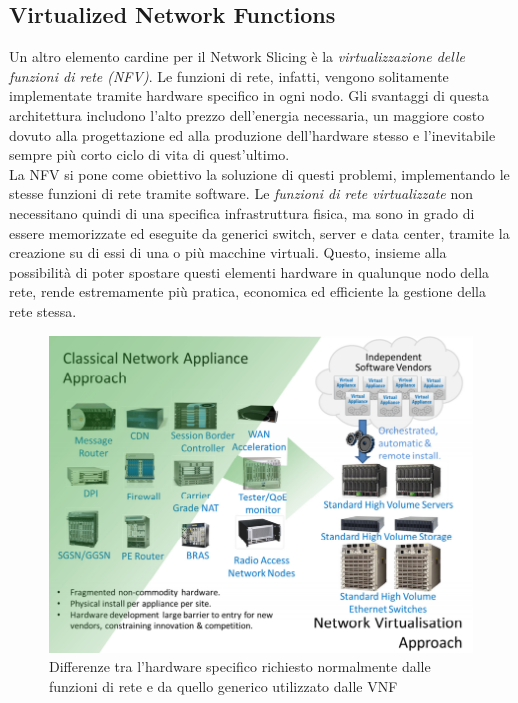 \subsection{Virtualized Network Functions}\label{ch:1.1.2}
Un altro elemento cardine per il Network Slicing è la \textit{virtualizzazione delle funzioni di rete (NFV)}. Le funzioni di rete, infatti, vengono solitamente implementate tramite hardware specifico in ogni nodo. Gli svantaggi di questa architettura includono l'alto prezzo dell'energia necessaria, un maggiore costo dovuto alla progettazione ed alla produzione dell'hardware stesso e l'inevitabile sempre più corto ciclo di vita di quest'ultimo.\\
La NFV si pone come obiettivo la soluzione di questi problemi, implementando le stesse funzioni di rete tramite software. Le \textit{funzioni di rete virtualizzate} non necessitano quindi di una specifica infrastruttura fisica, ma sono in grado di essere memorizzate ed eseguite da generici switch, server e data center, tramite la creazione su di essi di una o più macchine virtuali. Questo, insieme alla possibilità di poter spostare questi elementi hardware in qualunque nodo della rete, rende estremamente più pratica, economica ed efficiente la gestione della rete stessa. \cite{telecom_nfv}
\begin{figure}[h!]
	\centering
	\includegraphics[width=0.8\linewidth]{../immagini/nfv}
	\caption[Network Function Virtualization, NFV]{Differenze tra l'hardware specifico richiesto normalmente dalle funzioni di rete e da quello generico utilizzato dalle VNF}
	\label{fig:nfv}
\end{figure}

